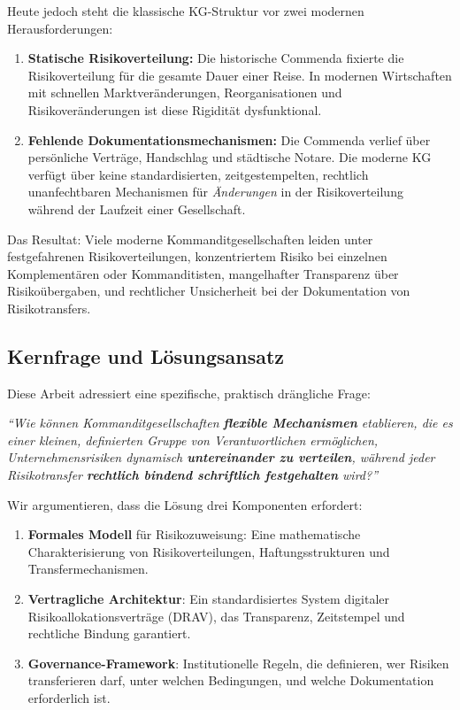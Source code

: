 \documentclass[a4paper, 12pt, twoside, openright]{report}
\theoremstyle{definition}
\theoremstyle{definition}
\begin{document}
Heute jedoch steht die klassische KG-Struktur vor zwei modernen Herausforderungen:

\begin{enumerate}
    \item \textbf{Statische Risikoverteilung:} Die historische Commenda fixierte die Risikoverteilung für die gesamte Dauer einer Reise. In modernen Wirtschaften mit schnellen Marktveränderungen, Reorganisationen und Risikoveränderungen ist diese Rigidität dysfunktional.
    
    \item \textbf{Fehlende Dokumentationsmechanismen:} Die Commenda verlief über persönliche Verträge, Handschlag und städtische Notare. Die moderne KG verfügt über keine standardisierten, zeitgestempelten, rechtlich unanfechtbaren Mechanismen für \emph{Änderungen} in der Risikoverteilung während der Laufzeit einer Gesellschaft.
\end{enumerate}

Das Resultat: Viele moderne Kommanditgesellschaften leiden unter festgefahrenen Risikoverteilungen, konzentriertem Risiko bei einzelnen Komplementären oder Kommanditisten, mangelhafter Transparenz über Risikoübergaben, und rechtlicher Unsicherheit bei der Dokumentation von Risikotransfers.

\subsection{Kernfrage und Lösungsansatz}

Diese Arbeit adressiert eine spezifische, praktisch drängliche Frage:

\begin{center}
\textit{``Wie können Kommanditgesellschaften \textbf{flexible Mechanismen} etablieren, die es einer kleinen, definierten Gruppe von Verantwortlichen ermöglichen, Unternehmensrisiken dynamisch \textbf{untereinander zu verteilen}, während jeder Risikotransfer \textbf{rechtlich bindend schriftlich festgehalten} wird?''}
\end{center}

Wir argumentieren, dass die Lösung drei Komponenten erfordert:

\begin{enumerate}
    \item \textbf{Formales Modell} für Risikozuweisung: Eine mathematische Charakterisierung von Risikoverteilungen, Haftungsstrukturen und Transfermechanismen.
    
    \item \textbf{Vertragliche Architektur}: Ein standardisiertes System digitaler Risikoallokationsverträge (DRAV), das Transparenz, Zeitstempel und rechtliche Bindung garantiert.
    
    \item \textbf{Governance-Framework}: Institutionelle Regeln, die definieren, wer Risiken transferieren darf, unter welchen Bedingungen, und welche Dokumentation erforderlich ist.
\end{enumerate}
\end{document}
